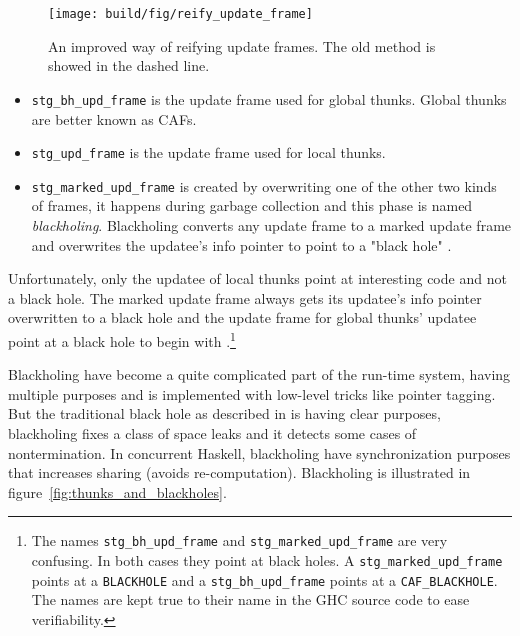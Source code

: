 \begin{figure}
\begin{mdframed}
  \texttt{[image: build/fig/reify\_update\_frame]}
  \caption{An improved way of reifying update frames. The old method is
  showed in the dashed line.}
  \label{fig:reify_update_frame}
\end{mdframed}
\end{figure}

\begin{itemize}
  \item
    \texttt{stg\_bh\_upd\_frame} is the update frame used for global
      thunks. Global thunks are better known as CAFs.
  \item
    \texttt{stg\_upd\_frame} is the update frame used for local
  thunks.
  \item
     \texttt{stg\_marked\_upd\_frame} is created
  by overwriting one of the other two kinds of frames, it
  happens during garbage collection and this phase is named
  \emph{blackholing}. Blackholing converts any update frame to a
  marked update frame \cite{github_overwrite_update_frame} and
  overwrites the updatee's info pointer to point to a "black hole"
  \cite{github_overwrite_blackhole}.
\end{itemize}

Unfortunately, only the updatee of local thunks point
at interesting code and not a black hole. The marked update frame
always gets its updatee's info pointer overwritten to a black
hole \cite{github_overwrite_blackhole} and the update frame
for global thunks' updatee point at a black hole to begin with
\cite{github_set_hdr_caf_blackhole}.\footnote{The names
  \texttt{stg\_bh\_upd\_frame} and \texttt{stg\_marked\_upd\_frame} are very
  confusing. In both cases they point at black holes. A
  \texttt{stg\_marked\_upd\_frame} points at a \texttt{BLACKHOLE} and a
  \texttt{stg\_bh\_upd\_frame} points at a \texttt{CAF\_BLACKHOLE}. The names
  are kept true to their name in the GHC source code to ease verifiability.}


Blackholing have become a quite complicated part of the run-time system,
having multiple purposes \cite{ghc_new_implementation_black_holes}
and is implemented with low-level tricks like pointer tagging. But the
traditional black hole as described in \cite{jones1992tail} is having
clear purposes, blackholing fixes a class of space leaks and it detects
some cases of nontermination. In concurrent Haskell, blackholing have
synchronization purposes that increases sharing (avoids re-computation). Blackholing
is illustrated in figure~\ref{fig:thunks_and_blackholes}.

